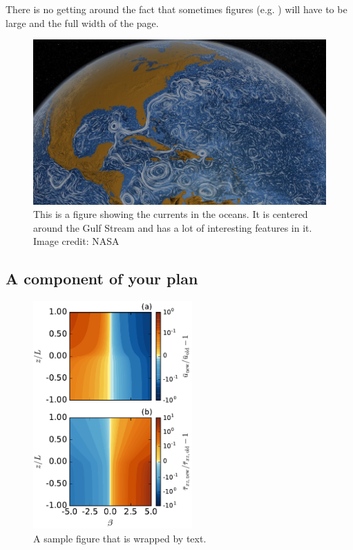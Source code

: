 \documentclass[nsfdescription]{nsfproposal}
\begin{document}
\lipsum[1-2]

There is no getting around the fact that sometimes figures (e.g. ) will have to be large and the full width of the page. 
\begin{figure}[htb]
	\centering
	\includegraphics[width=6in]{Figures/oceanmotion.jpg}
	\caption{This is a figure showing the currents in the oceans. It is centered around the Gulf Stream and has a lot
		of interesting features in it. Image credit: NASA \label{fig:oceanmotion}}
\end{figure}
\lipsum[1-2]

\subsection{A component of your plan}
\lipsum[1-2]

\begin{figure}
	 \vspace{-15pt}
 	\centering
 	\includegraphics[width=2.4in]{Figures/sample1}
 	\caption{A sample figure that is wrapped by text.}
 	\label{fig1}
\end{figure}
\end{document}

